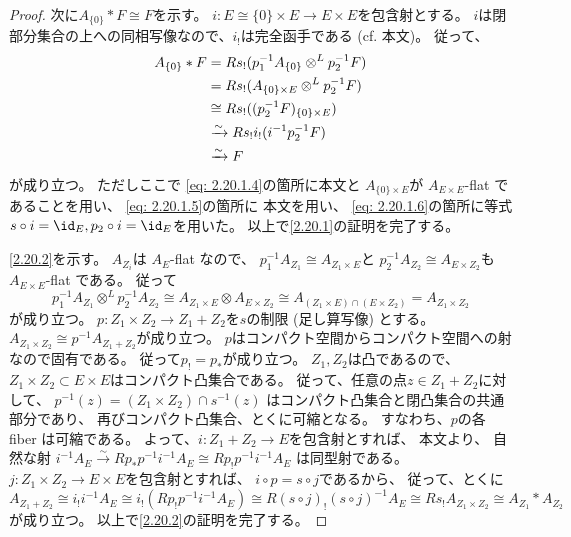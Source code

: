 \documentclass[uplatex,dvipdfmx]{jsarticle}
\begin{document}
\begin{proof}
  次に\(A_{\{0\}}*F\cong F\)を示す。
  \(i:E\cong \{0\}\times E \to E\times E\)を包含射とする。
  \(i\)は閉部分集合の上への同相写像なので、\(i_!\)は完全函手である
  (cf. 本文\cite[Proposition 2.5.4 (i)]{kashiwara2002sheaves})。
  従って、
  \begin{align}
    A_{\{0\}}*F
    &= Rs_!(p_1^{-1}A_{\{0\}}\otimes^L p_2^{-1}F) \notag \\
    &= Rs_!(A_{\{0\}\times E}\otimes^L p_2^{-1}F) \notag \\
    &\cong Rs_!((p_2^{-1}F)_{\{0\}\times E}) \label{eq: 2.20.1.4} \\
    &\xrightarrow{\sim}
    Rs_!i_!(i^{-1}p_2^{-1}F) \label{eq: 2.20.1.5} \\
    &\xrightarrow{\sim} F \label{eq: 2.20.1.6}
  \end{align}
  が成り立つ。
  ただしここで
  \eqref{eq: 2.20.1.4}の箇所に本文\cite[Proposition 2.3.10]{kashiwara2002sheaves}と
  \(A_{\{0\}\times E}\)が \(A_{E\times E}\)-flat であることを用い、
  \eqref{eq: 2.20.1.5}の箇所に
  本文\cite[Proposition 2.5.4(ii)]{kashiwara2002sheaves}を用い、
  \eqref{eq: 2.20.1.6}の箇所に等式
  \(s\circ i = \id_E, p_2\circ i = \id_E\)を用いた。
  以上で\ref{2.20.1}の証明を完了する。

  \ref{2.20.2}を示す。
  \(A_{Z_i}\)は \(A_E\)-flat なので、
  \(p_1^{-1}A_{Z_1} \cong A_{Z_1\times E}\)と
  \(p_2^{-1}A_{Z_2} \cong A_{E\times Z_2}\)も
  \(A_{E\times E}\)-flat である。
  従って
  \[
  p_1^{-1}A_{Z_1}\otimes^L p_2^{-1}A_{Z_2} \cong
  A_{Z_1\times E}\otimes A_{E\times Z_2}
  \cong A_{(Z_1\times E)\cap (E\times Z_2)}
  = A_{Z_1\times Z_2}
  \]
  が成り立つ。
  \(p:Z_1\times Z_2\to Z_1+Z_2\)を\(s\)の制限 (足し算写像) とする。
  \(A_{Z_1\times Z_2} \cong p^{-1}A_{Z_1+Z_2}\)が成り立つ。
  \(p\)はコンパクト空間からコンパクト空間への射なので固有である。
  従って\(p_!=p_*\)が成り立つ。
  \(Z_1,Z_2\)は凸であるので、
  \(Z_1\times Z_2\subset E\times E\)はコンパクト凸集合である。
  従って、任意の点\(z\in Z_1+Z_2\)に対して、
  \(p^{-1}(z) = (Z_1\times Z_2)\cap s^{-1}(z)\)
  はコンパクト凸集合と閉凸集合の共通部分であり、
  再びコンパクト凸集合、とくに可縮となる。
  すなわち、\(p\)の各 fiber は可縮である。
  よって、\(i:Z_1+Z_2\to E\)を包含射とすれば、
  本文\cite[Corollary 2.7.7 (iv)]{kashiwara2002sheaves}より、
  自然な射
  \(i^{-1}A_E\xrightarrow{\sim} Rp_*p^{-1}i^{-1}A_E \cong Rp_!p^{-1}i^{-1}A_E\)
  は同型射である。
  \(j:Z_1\times Z_2\to E\times E\)を包含射とすれば、
  \(i\circ p = s\circ j\)であるから、
  従って、とくに
  \[
  A_{Z_1+Z_2}\cong i_!i^{-1}A_E
  \cong i_!(Rp_!p^{-1}i^{-1}A_E)
  \cong R(s\circ j)_!(s\circ j)^{-1}A_E
  \cong Rs_!A_{Z_1\times Z_2}
  \cong A_{Z_1}*A_{Z_2}
  \]
  が成り立つ。
  以上で\ref{2.20.2}の証明を完了する。


\end{proof}
\end{document}
